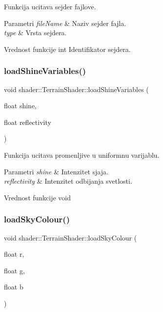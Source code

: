 Funkcija ucitava sejder fajlove. 


\begin{DoxyParams}{Parametri}
{\em file\+Name} & Naziv sejder fajla. \\
\hline
{\em type} & Vrsta sejdera. \\
\hline
\end{DoxyParams}
\begin{DoxyReturn}{Vrednost funkcije}
int Identifikator sejdera. 
\end{DoxyReturn}
\mbox{\label{classshader_1_1TerrainShader_a726a1237f6c1ebae3c3534b80260c553}} 
\subsubsection{\texorpdfstring{load\+Shine\+Variables()}{loadShineVariables()}}
{\footnotesize\ttfamily void shader\+::\+Terrain\+Shader\+::load\+Shine\+Variables (\begin{DoxyParamCaption}\item[{float}]{shine,  }\item[{float}]{reflectivity }\end{DoxyParamCaption})}



Funkcija ucitava promenljive u uniformnu varijablu. 


\begin{DoxyParams}{Parametri}
{\em shine} & Intenzitet sjaja. \\
\hline
{\em reflectivity} & Intenzitet odbijanja svetlosti. \\
\hline
\end{DoxyParams}
\begin{DoxyReturn}{Vrednost funkcije}
void 
\end{DoxyReturn}
\mbox{\label{classshader_1_1TerrainShader_af1a33992fb70f65ba37dba1e4027a74e}} 
\subsubsection{\texorpdfstring{load\+Sky\+Colour()}{loadSkyColour()}}
{\footnotesize\ttfamily void shader\+::\+Terrain\+Shader\+::load\+Sky\+Colour (\begin{DoxyParamCaption}\item[{float}]{r,  }\item[{float}]{g,  }\item[{float}]{b }\end{DoxyParamCaption})}



